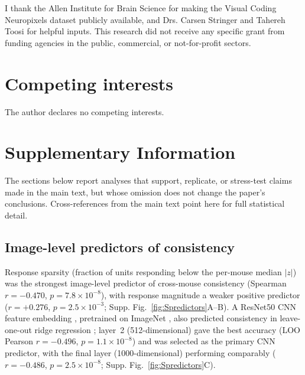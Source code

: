 \documentclass[11pt,onecolumn]{article}
\begin{document}
I thank the Allen Institute for Brain Science for making the Visual Coding
Neuropixels dataset publicly available, and Drs. Carsen Stringer and
Tahereh Toosi for helpful inputs. This research did not receive any specific
grant from funding agencies in the public, commercial, or not-for-profit
sectors.

\section*{Competing interests}

The author declares no competing interests.

\clearpage
\section*{Supplementary Information}

The sections below report analyses that support, replicate, or stress-test
claims made in the main text, but whose omission does not change the
paper's conclusions. Cross-references from the main text point here for
full statistical detail.

\setcounter{figure}{0}
\renewcommand{\thefigure}{S\arabic{figure}}

\subsection*{Image-level predictors of consistency}
\label{supp:predictors}

Response sparsity (fraction of units responding below the per-mouse
median $|z|$) was the strongest image-level predictor of cross-mouse
consistency (Spearman $r = -0.470$, $p = 7.8 \times 10^{-8}$), with
response magnitude a weaker positive predictor ($r = +0.276$,
$p = 2.5 \times 10^{-3}$; Supp. Fig.~\ref{fig:Spredictors}A--B). A
ResNet50 CNN feature embedding \citep{he2016}, pretrained on ImageNet
\citep{deng2009}, also predicted consistency in leave-one-out ridge
regression \citep{hoerl1970}; layer~2 (512-dimensional) gave the best
accuracy (LOO Pearson $r = -0.496$, $p = 1.1 \times 10^{-8}$) and was
selected as the primary CNN predictor, with the final layer
(1000-dimensional) performing comparably ($r = -0.486$,
$p = 2.5 \times 10^{-8}$; Supp. Fig.~\ref{fig:Spredictors}C).
\end{document}
